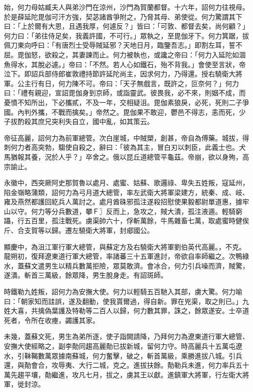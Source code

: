 \begin{pinyinscope}
 始，何力母姑臧夫人與弟沙門在涼州，沙門為賀蘭都督。十六年，詔何力往視母。於是薛延陀毘伽可汗方強，契苾諸酋爭附之，乃脅其母、弟使從。何力驚謂其下曰：「上於爾有大恩，且遇我厚，何遽反？」皆曰：「可敦、都督去矣，尚何顧？」何力曰：「弟往侍足矣，我義許國，不可行。」眾執之，至毘伽牙下。何力箕踞，拔佩刀東向呼曰：「有唐烈士受辱賊延邪？天地日月，臨鑒吾志。」即割左耳，誓不屈。毘伽怒，欲殺之，其妻諫而止。何力被執也，或讒之帝曰：「何力入延陀如涸魚得水，其脫必遽。」帝曰：「不然。若人心如鐵石，殆不背我。」會使至言狀，帝泣下。即詔兵部侍郎崔敦禮持節許延陀尚主，因求何力，乃得還。授右驍衛大將軍。公主行有日，何力陳不可。帝曰：「天子無戲言，既許之，叵奈何？」何力曰：「禮有親迎，宣詔毘伽身到京師，或詣靈武。彼畏我，必不來，則姻不成，而憂憤不知所出，下必攜貳，不及一年，交相疑沮。毘伽素狼戾，必死，死則二子爭國。內判外攜，不戰而擒矣。」帝然之。毘伽果不敢迎，鬱邑不得志，恚而死，少子拔酌殺其庶兄突利失自立，國中亂，如其策云。



 帝征高麗，詔何力為前軍總管。次白崖城，中賊槊，創甚，帝自為傅藥。城拔，得刺何力者高突勃，騶使自殺之，辭曰：「彼為其主，冒白刃以刺臣，此義士也。犬馬猶報其養，況於人乎？」卒舍之。俄以昆丘道總管平龜茲。帝崩，欲以身殉，高宗諭止。



 永徽中，西突厥阿史那賀魯以處月、處蜜、姑蘇、歌邏祿、卑失五姓叛，寇延州，陷金嶺略蒲類，詔何力為弓月道大總管，率左武衛大將軍梁建方，統秦、成、岐、雍及燕然都護回紇兵人萬討之。處月酋硃邪孤注遂殺招慰使果毅都尉單道惠，據牢山以守。何力等分兵數道，攀Ｆ〗反而上，急攻之，賊大潰，孤注液遁。輕騎窮躡，行五百里，孤注戰死。虜渠帥六十，俘斬萬餘，牛馬雜畜七萬，取處蜜時健俟斤、合支賀等以歸。遷左驍衛大將軍，封郕國公。



 顯慶中，為沮江軍行軍大總管，與蘇定方及右驍衛大將軍劉伯英代高麗。，不克。龍朔初，復拜遼東道行軍大總管，率諸蕃三十五軍進討，帝欲自率師繼之。次鴨綠水，蓋蘇文遣男生以精兵數萬拒險，眾莫敢濟。會冰合，何力引兵噪而濟，賊驚，遂潰。斬首三萬級，餘眾降，男生脫身走。有詔斑師。



 時鐵勒九姓叛，詔何力為安撫大使。何力以輕騎五百馳入其部，虜大驚。何力喻曰：「朝家知而詿誤，遂及翻動，使我貰爾過，得自新。罪在兇渠，取之則已。」九姓大喜，共擒偽葉護及特勒等二百人以歸，何力數其罪，誅之，餘眾遂安。士卒道死者，令所在收瘞，蠲護其家。



 未幾，蓋蘇文死，男生為弟所逐，使子詣闕請降，乃拜何力為遼東道行軍大總管、安撫大使經略之，副李勣同趨高麗勣已拔新城，留何力守。時高麗兵十五萬屯遼水，引靺鞨數萬眾據南蘇城，何力奮擊，破之，斬首萬級，乘勝進拔八城。引兵還，與勣會合，攻辱夷、大行二城，克之。進拔扶餘。勣勒兵未進，何力率兵五十萬先趨平壤，勣繼進，攻凡七月，拔之，虜其王以獻。進鎮軍大將軍，行左衛大將軍，徙封涼。




\end{pinyinscope}
